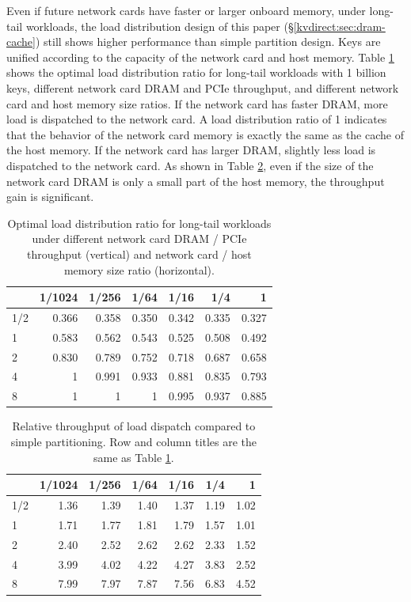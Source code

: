 Even if future network cards have faster or larger onboard memory, under long-tail workloads, the load distribution design of this paper (\S \ref {kvdirect:sec:dram-cache}) still shows higher performance than simple partition design. Keys are unified according to the capacity of the network card and host memory.
Table \ref {kvdirect:tab:optimal-load-dispatch} shows the optimal load distribution ratio for long-tail workloads with 1 billion keys, different network card DRAM and PCIe throughput, and different network card and host memory size ratios.
If the network card has faster DRAM, more load is dispatched to the network card. A load distribution ratio of 1 indicates that the behavior of the network card memory is exactly the same as the cache of the host memory.
If the network card has larger DRAM, slightly less load is dispatched to the network card.
As shown in Table \ref {kvdirect:tab:optimal-load-dispatch-throughput}, even if the size of the network card DRAM is only a small part of the host memory, the throughput gain is significant.

\begin{table}[htbp]
	\centering
	\caption{Optimal load distribution ratio for long-tail workloads under different network card DRAM / PCIe throughput (vertical) and network card / host memory size ratio (horizontal).}
	\label{kvdirect:tab:optimal-load-dispatch}
	\small
	\begin{tabular}{|l|r|r|r|r|r|r|}
		\hline
		& 1/1024 & 1/256 & 1/64 & 1/16 & 1/4 & 1 \\
		\hline
		1/2  & 0.366 & 0.358 & 0.350 & 0.342 & 0.335 & 0.327 \\
		\hline
		1    & 0.583 & 0.562 & 0.543 & 0.525 & 0.508 & 0.492 \\
		\hline
		2    & 0.830 & 0.789 & 0.752 & 0.718 & 0.687 & 0.658 \\
		\hline
		4    & 1     & 0.991 & 0.933 & 0.881 & 0.835 & 0.793 \\
		\hline
		8    & 1     & 1     & 1     & 0.995 & 0.937 & 0.885 \\
		\hline
	\end{tabular}
\end{table}


\begin{table}[htbp]
	\centering
	\caption{Relative throughput of load dispatch compared to simple partitioning. Row and column titles are the same as Table \ref{kvdirect:tab:optimal-load-dispatch}.}
	\label{kvdirect:tab:optimal-load-dispatch-throughput}
	\small
	\begin{tabular}{|l|r|r|r|r|r|r|}
		\hline
		& 1/1024 & 1/256 & 1/64 & 1/16 & 1/4 & 1 \\
		\hline
		1/2 & 1.36	& 1.39	& 1.40	& 1.37	& 1.19	& 1.02 \\ 
		\hline
		1	& 1.71	& 1.77	& 1.81	& 1.79	& 1.57	& 1.01 \\
		\hline
		2	& 2.40	& 2.52	& 2.62	& 2.62	& 2.33	& 1.52 \\
		\hline
		4	& 3.99	& 4.02	& 4.22	& 4.27	& 3.83	& 2.52 \\
		\hline
		8	& 7.99	& 7.97	& 7.87	& 7.56	& 6.83	& 4.52 \\
		\hline
	\end{tabular}
\end{table}


